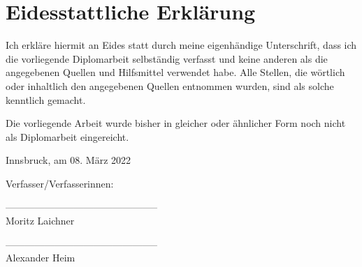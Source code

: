 \section*{Eidesstattliche Erklärung}

Ich erkläre hiermit an Eides statt durch meine eigenhändige Unterschrift, dass ich die vorliegende Diplomarbeit selbständig verfasst und keine anderen als die angegebenen Quellen und Hilfsmittel verwendet habe. Alle Stellen, die wörtlich oder inhaltlich den angegebenen Quellen entnommen wurden, sind als solche kenntlich gemacht.

Die vorliegende Arbeit wurde bisher in gleicher oder ähnlicher Form noch nicht als Diplomarbeit eingereicht.

Innsbruck, am 08. März 2022

\vspace*{3cm}



Verfasser/Verfasserinnen:

\vspace*{2cm}


-----------------------------------------------\\
\hspace*{1.3cm}           Moritz Laichner

\vspace*{2cm}


-----------------------------------------------\\
\hspace*{1.3cm}           Alexander Heim



\newpage